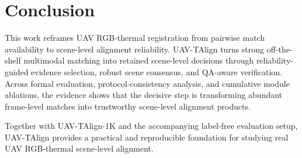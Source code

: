 
\section{Conclusion}

This work reframes UAV RGB-thermal registration from pairwise match availability to scene-level
alignment reliability. UAV-TAlign turns strong off-the-shelf multimodal matching into retained
scene-level decisions through reliability-guided evidence selection, robust scene consensus, and
QA-aware verification. Across formal evaluation, protocol-consistency analysis, and cumulative
module ablations, the evidence shows that the decisive step is transforming abundant frame-level
matches into trustworthy scene-level alignment products.

Together with UAV-TAlign-1K and the accompanying label-free evaluation setup, UAV-TAlign provides a
practical and reproducible foundation for studying real UAV RGB-thermal scene-level alignment.
